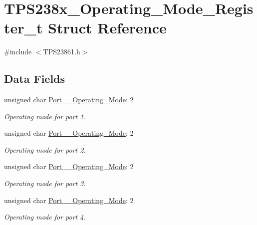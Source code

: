 \hypertarget{struct_t_p_s238x___operating___mode___register__t}{\section{T\-P\-S238x\-\_\-\-Operating\-\_\-\-Mode\-\_\-\-Register\-\_\-t Struct Reference}
\label{struct_t_p_s238x___operating___mode___register__t}
}


{\ttfamily \#include $<$T\-P\-S23861.\-h$>$}

\subsection*{Data Fields}
\begin{DoxyCompactItemize}
\item 
unsigned char \hyperlink{struct_t_p_s238x___operating___mode___register__t_aacbe984ebf84f291788cc29c366b7617}{Port\-\_\-\_\-\-Operating\-\_\-\-Mode}\-: 2
\begin{DoxyCompactList}\small\item\em Operating mode for port 1. \end{DoxyCompactList}\item 
unsigned char \hyperlink{struct_t_p_s238x___operating___mode___register__t_a20ef74c548a17384ae43c2a3e71d3897}{Port\-\_\-\_\-\-Operating\-\_\-\-Mode}\-: 2
\begin{DoxyCompactList}\small\item\em Operating mode for port 2. \end{DoxyCompactList}\item 
unsigned char \hyperlink{struct_t_p_s238x___operating___mode___register__t_a144c510b8911a36d262339244d182c38}{Port\-\_\-\_\-\-Operating\-\_\-\-Mode}\-: 2
\begin{DoxyCompactList}\small\item\em Operating mode for port 3. \end{DoxyCompactList}\item 
unsigned char \hyperlink{struct_t_p_s238x___operating___mode___register__t_a8433fd46ed96047bdfb0904dd3018a11}{Port\-\_\-\_\-\-Operating\-\_\-\-Mode}\-: 2
\begin{DoxyCompactList}\small\item\em Operating mode for port 4. \end{DoxyCompactList}\end{DoxyCompactItemize}


